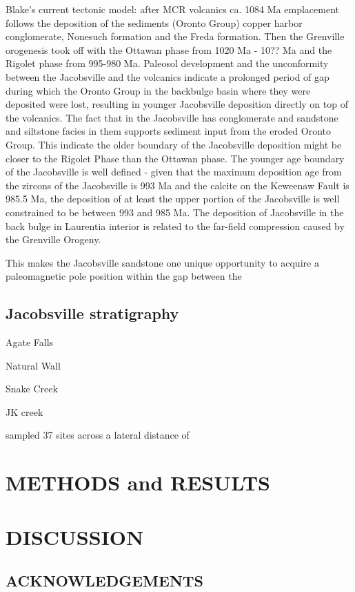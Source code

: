 \documentclass[11pt,letterpaper]{article}
\begin{document}
Blake's current tectonic model: after MCR volcanics ca. 1084 Ma emplacement follows the deposition of the sediments (Oronto Group) copper harbor conglomerate, Nonesuch formation and the Freda formation. Then the Grenville orogenesis took off with the Ottawan phase from 1020 Ma - 10?? Ma and the Rigolet phase from 995-980 Ma. Paleosol development and the unconformity between the Jacobsville and the volcanics indicate a prolonged period of gap during which the Oronto Group in the backbulge basin where they were deposited were lost, resulting in younger Jacobsville deposition directly on top of the volcanics. The fact that in the Jacobsville has conglomerate and sandstone and siltstone facies in them supports sediment input from the eroded Oronto Group. This indicate the older boundary of the Jacobsville deposition might be closer to the Rigolet Phase than the Ottawan phase. The younger age boundary of the Jacobsville is well defined - given that the maximum deposition age from the zircons of the Jacobsville is 993 Ma and the calcite on the Keweenaw Fault is 985.5 Ma, the deposition of at least the upper portion of the Jacobsville is well constrained to be between 993 and 985 Ma. The deposition of Jacobsville in the back bulge in Laurentia interior is related to the far-field compression caused by the Grenville Orogeny. 

This makes the Jacobsville sandstone one unique opportunity to acquire a paleomagnetic pole position within the gap between the 

\subsection{Jacobsville stratigraphy}

Agate Falls

Natural Wall

Snake Creek

JK creek


\cite{Roy1978a} sampled 37 sites across a lateral distance of 




\section*{METHODS and RESULTS}



\section*{DISCUSSION}





\subsection*{ACKNOWLEDGEMENTS}


\singlespacing
\clearpage


\end{document}
